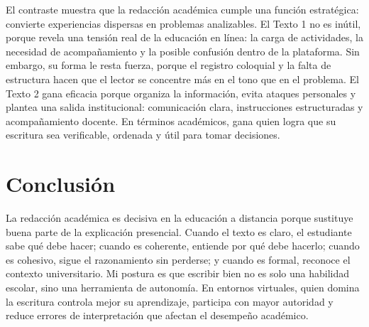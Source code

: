 \documentclass[
	spanish, %
	letterpaper, oneside
]{article}
\begin{document}
El contraste muestra que la redacción académica cumple una función estratégica: convierte experiencias dispersas en problemas analizables. El Texto 1 no es inútil, porque revela una tensión real de la educación en línea: la carga de actividades, la necesidad de acompañamiento y la posible confusión dentro de la plataforma. Sin embargo, su forma le resta fuerza, porque el registro coloquial y la falta de estructura hacen que el lector se concentre más en el tono que en el problema. El Texto 2 gana eficacia porque organiza la información, evita ataques personales y plantea una salida institucional: comunicación clara, instrucciones estructuradas y acompañamiento docente. En términos académicos, gana quien logra que su escritura sea verificable, ordenada y útil para tomar decisiones.

\section{Conclusión}

La redacción académica es decisiva en la educación a distancia porque sustituye buena parte de la explicación presencial. Cuando el texto es claro, el estudiante sabe qué debe hacer; cuando es coherente, entiende por qué debe hacerlo; cuando es cohesivo, sigue el razonamiento sin perderse; y cuando es formal, reconoce el contexto universitario. Mi postura es que escribir bien no es solo una habilidad escolar, sino una herramienta de autonomía. En entornos virtuales, quien domina la escritura controla mejor su aprendizaje, participa con mayor autoridad y reduce errores de interpretación que afectan el desempeño académico.



\end{document}
